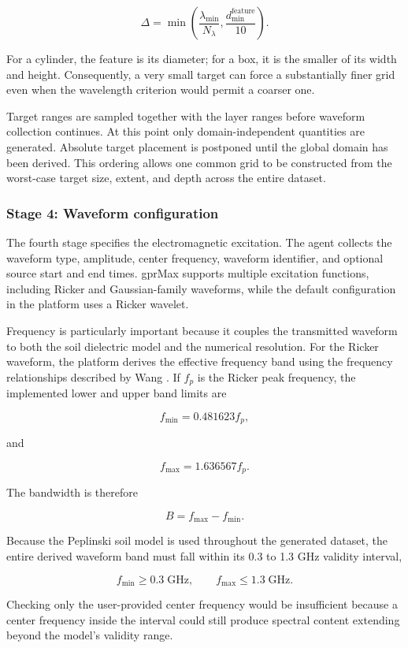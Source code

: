 \documentclass[journal]{IEEEtran}
\begin{document}
$$
\Delta
=
\min
\left(
\frac{\lambda_{\min}}{N_{\lambda}},
\frac{d_{\min}^{\mathrm{feature}}}{10}
\right).
$$

For a cylinder, the feature is its diameter; for a box, it is the smaller of its width and height. Consequently, a very small target can force a substantially finer grid even when the wavelength criterion would permit a coarser one.

Target ranges are sampled together with the layer ranges before waveform collection continues. At this point only domain-independent quantities are generated. Absolute target placement is postponed until the global domain has been derived. This ordering allows one common grid to be constructed from the worst-case target size, extent, and depth across the entire dataset.

\subsubsection{Stage 4: Waveform configuration}

The fourth stage specifies the electromagnetic excitation. The agent collects the waveform type, amplitude, center frequency, waveform identifier, and optional source start and end times. gprMax supports multiple excitation functions, including Ricker and Gaussian-family waveforms, while the default configuration in the platform uses a Ricker wavelet.

Frequency is particularly important because it couples the transmitted waveform to both the soil dielectric model and the numerical resolution. For the Ricker waveform, the platform derives the effective frequency band using the frequency relationships described by Wang \cite{wang2015frequencies}. If \(f_p\) is the Ricker peak frequency, the implemented lower and upper band limits are

$$
f_{\min}=0.481623f_p,
$$

and

$$
f_{\max}=1.636567f_p.
$$

The bandwidth is therefore

$$
B=f_{\max}-f_{\min}.
$$

Because the Peplinski soil model is used throughout the generated dataset, the entire derived waveform band must fall within its 0.3 to 1.3 GHz validity interval,

$$
f_{\min}\geq 0.3\;\mathrm{GHz},
\qquad
f_{\max}\leq 1.3\;\mathrm{GHz}.
$$

Checking only the user-provided center frequency would be insufficient because a center frequency inside the interval could still produce spectral content extending beyond the model's validity range.
\end{document}
